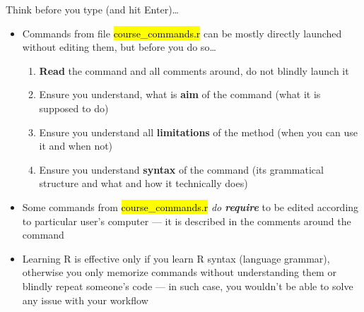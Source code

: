 \documentclass[compress, ucs, xelatex, 11pt, xcolor=svgnames,
	hyperref={
		bookmarks=true,
		unicode=true,
		colorlinks=true,
		pdftitle={Molecular data in R},
		plainpages=false,
		pdfauthor={Vojtech Zeisek},
		pdfsubject={Course about phylogeny and evolution in R},
		pdfcreator={XeLaTeX},
		pdfkeywords={R, evolution, phylogeny, molecular data},
		linkcolor=Tomato,
		anchorcolor=SaddleBrown,
		citecolor=Goldenrod,
		filecolor=DarkMagenta,
		menucolor=Sienna,
		urlcolor=DarkTurquoise,
		pdftex},
	url={hyphens, lowtilde} %
	]{beamer}
\renewcommand{\texttt}[1]{\hl{\ttfamily #1}}
\begin{document}
\begin{frame}{Think before you type (and hit Enter)\ldots}
	\begin{itemize}
		\item Commands from file \texttt{course\_commands.r} can be mostly directly launched without editing them, but before you do so\ldots
		\begin{enumerate}
			\item \textbf{Read} the command and all comments around, do not blindly launch it
			\item Ensure you understand, what is \textbf{aim} of the command (what it is supposed to do)
			\item Ensure you understand all \textbf{limitations} of the method (when you can use it and when not)
			\item Ensure you understand \textbf{syntax} of the command (its grammatical structure and what and how it technically does)
		\end{enumerate}
		\item Some \alert{commands} from \texttt{course\_commands.r} \alert{\textit{do \textbf{require}} to be edited} according to particular user's computer --- it is described in the comments around the command
		\item Learning R is effective only if you learn R syntax (language grammar), otherwise you only memorize commands without understanding them or blindly repeat someone's code --- in such case, you wouldn't be able to solve any issue with your workflow
	\end{itemize}
\end{frame}
\end{document}
